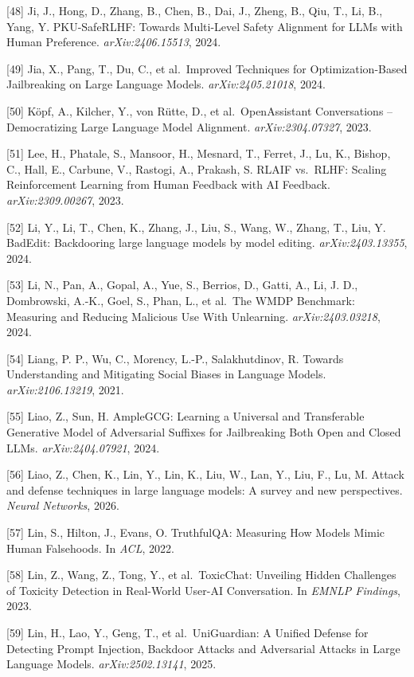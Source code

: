 {[}48{]} Ji, J., Hong, D., Zhang, B., Chen, B., Dai, J., Zheng, B., Qiu, T., Li, B., Yang, Y. PKU-SafeRLHF: Towards Multi-Level Safety Alignment for LLMs with Human Preference. \emph{arXiv:2406.15513}, 2024.

{[}49{]} Jia, X., Pang, T., Du, C., et al.~Improved Techniques for Optimization-Based Jailbreaking on Large Language Models. \emph{arXiv:2405.21018}, 2024.

{[}50{]} Köpf, A., Kilcher, Y., von Rütte, D., et al.~OpenAssistant Conversations -- Democratizing Large Language Model Alignment. \emph{arXiv:2304.07327}, 2023.

{[}51{]} Lee, H., Phatale, S., Mansoor, H., Mesnard, T., Ferret, J., Lu, K., Bishop, C., Hall, E., Carbune, V., Rastogi, A., Prakash, S. RLAIF vs.~RLHF: Scaling Reinforcement Learning from Human Feedback with AI Feedback. \emph{arXiv:2309.00267}, 2023.

{[}52{]} Li, Y., Li, T., Chen, K., Zhang, J., Liu, S., Wang, W., Zhang, T., Liu, Y. BadEdit: Backdooring large language models by model editing. \emph{arXiv:2403.13355}, 2024.

{[}53{]} Li, N., Pan, A., Gopal, A., Yue, S., Berrios, D., Gatti, A., Li, J. D., Dombrowski, A.-K., Goel, S., Phan, L., et al.~The WMDP Benchmark: Measuring and Reducing Malicious Use With Unlearning. \emph{arXiv:2403.03218}, 2024.

{[}54{]} Liang, P. P., Wu, C., Morency, L.-P., Salakhutdinov, R. Towards Understanding and Mitigating Social Biases in Language Models. \emph{arXiv:2106.13219}, 2021.

{[}55{]} Liao, Z., Sun, H. AmpleGCG: Learning a Universal and Transferable Generative Model of Adversarial Suffixes for Jailbreaking Both Open and Closed LLMs. \emph{arXiv:2404.07921}, 2024.

{[}56{]} Liao, Z., Chen, K., Lin, Y., Lin, K., Liu, W., Lan, Y., Liu, F., Lu, M. Attack and defense techniques in large language models: A survey and new perspectives. \emph{Neural Networks}, 2026.

{[}57{]} Lin, S., Hilton, J., Evans, O. TruthfulQA: Measuring How Models Mimic Human Falsehoods. In \emph{ACL}, 2022.

{[}58{]} Lin, Z., Wang, Z., Tong, Y., et al.~ToxicChat: Unveiling Hidden Challenges of Toxicity Detection in Real-World User-AI Conversation. In \emph{EMNLP Findings}, 2023.

{[}59{]} Lin, H., Lao, Y., Geng, T., et al.~UniGuardian: A Unified Defense for Detecting Prompt Injection, Backdoor Attacks and Adversarial Attacks in Large Language Models. \emph{arXiv:2502.13141}, 2025.

